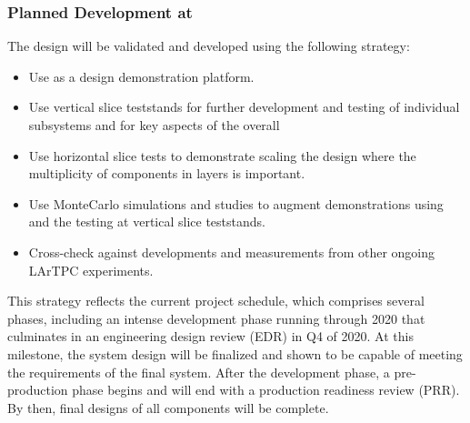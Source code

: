 


\subsubsection{Planned Development at }
\label{sec:sp-daq:design-validation}

The    design will be validated and developed using the following strategy:
\begin{itemize}
\item Use  as a design demonstration platform. 
\item Use vertical slice teststands for further development and testing of
  individual  subsystems and for key aspects of the
  overall 
\item Use horizontal slice tests to demonstrate scaling the design where the multiplicity of components in layers is important.
\item Use  MonteCarlo simulations and studies to augment
  demonstrations using  and the testing at vertical slice teststands.
\item Cross-check against developments and measurements from other ongoing
  LArTPC experiments.
\end{itemize}

This strategy reflects the current  project schedule, which
comprises several phases, including an intense development phase
running through 2020 that culminates in an engineering design
review (EDR) in Q4 of 2020. At this milestone, the system design will be
finalized and shown to be capable of meeting the requirements of the
final  system. After the development phase, a
pre-production phase begins and will end with a production readiness
review (PRR). By then, final designs of all components
will be complete.

